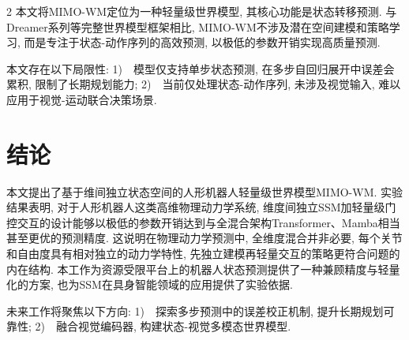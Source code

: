 \begin{multicols}{2}
本文将MIMO-WM定位为一种轻量级世界模型, 其核心功能是状态转移预测.
与Dreamer系列等完整世界模型框架相比, MIMO-WM不涉及潜在空间建模和策略学习, 而是专注于状态-动作序列的高效预测, 以极低的参数开销实现高质量预测.

本文存在以下局限性:
1)~~模型仅支持单步状态预测, 在多步自回归展开中误差会累积, 限制了长期规划能力;
2)~~当前仅处理状态-动作序列, 未涉及视觉输入, 难以应用于视觉-运动联合决策场景.

\section{结论}

本文提出了基于维间独立状态空间的人形机器人轻量级世界模型MIMO-WM. 实验结果表明, 对于人形机器人这类高维物理动力学系统, 维度间独立SSM加轻量级门控交互的设计能够以极低的参数开销达到与全混合架构Transformer、Mamba相当甚至更优的预测精度. 这说明在物理动力学预测中, 全维度混合并非必要, 每个关节和自由度具有相对独立的动力学特性, 先独立建模再轻量交互的策略更符合问题的内在结构. 本工作为资源受限平台上的机器人状态预测提供了一种兼顾精度与轻量化的方案, 也为SSM在具身智能领域的应用提供了实验依据.

未来工作将聚焦以下方向:
1)~~探索多步预测中的误差校正机制, 提升长期规划可靠性;
2)~~融合视觉编码器, 构建状态-视觉多模态世界模型.


\end{multicols}
